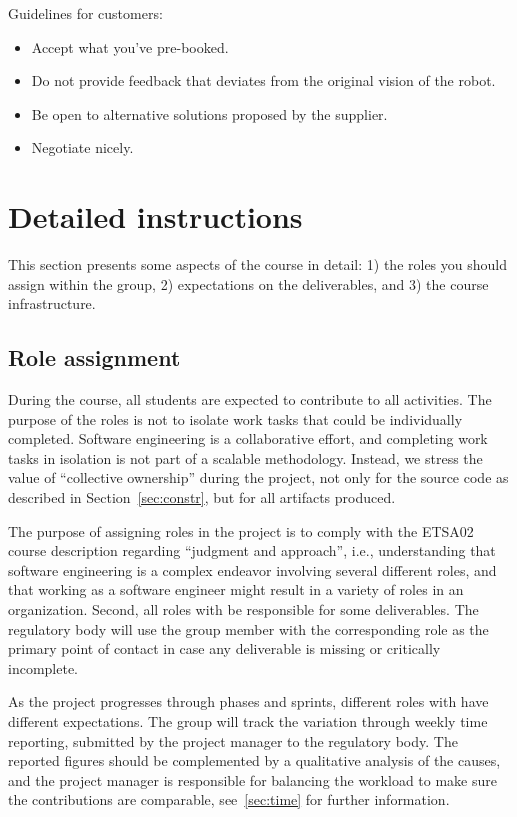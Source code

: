 \documentclass{scrreprt}
\begin{document}
Guidelines for customers:
\begin{itemize}
\item Accept what you've pre-booked.
\item Do not provide feedback that deviates from the original vision of the robot.
\item Be open to alternative solutions proposed by the supplier.
\item Negotiate nicely.
\end{itemize}

\chapter{Detailed instructions}
This section presents some aspects of the course in detail: 1) the roles you should assign within the group, 2) expectations on the deliverables, and 3) the course infrastructure.

\section{Role assignment} \label{sec:roles}
During the course, all students are expected to contribute to all activities. The purpose of the roles is not to isolate work tasks that could be individually completed. Software engineering is a collaborative effort, and completing work tasks in isolation is not part of a scalable methodology. Instead, we stress the value of ``collective ownership'' during the project, not only for the source code as described in Section~\ref{sec:constr}, but for all artifacts produced.

The purpose of assigning roles in the project is to comply with the ETSA02 course description regarding ``judgment and approach'', i.e., understanding that software engineering is a complex endeavor involving several different roles, and that working as a software engineer might  result in a variety of roles in an organization. Second, all roles with be responsible for some deliverables. The regulatory body will use the group member with the corresponding role as the primary point of contact in case any deliverable is missing or critically incomplete.

As the project progresses through phases and sprints, different roles with have different expectations. The group will track the variation through weekly time reporting, submitted by the project manager to the regulatory body. The reported figures should be complemented by a qualitative analysis of the causes, and the project manager is responsible for balancing the workload to make sure the contributions are comparable, see~\ref{sec:time} for further information.
\end{document}
